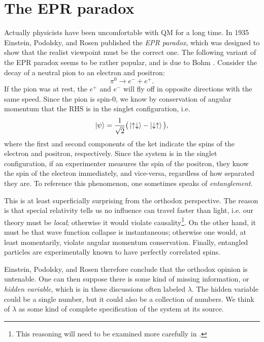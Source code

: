 \section{The EPR paradox}
Actually physicists have been uncomfortable with QM for a long time.
In 1935 Einstein, Podolsky, and Rosen
\cite{einstein_can_1935} published the {\it EPR paradox},
which was designed to show that the realist viewpoint must be
the correct one. The following variant of the EPR paradox seems to be
rather popular, and is due to Bohm \cite{bohm_quantum_1951}.
Consider the decay of a neutral pion to an electron and positron:
\begin{equation}
  \pi^0\to e^-+e^+.
\end{equation}
If the pion was at rest, the $e^+$ and $e^-$ will fly off in opposite
directions with the same speed. Since the pion is spin-0, we know
by conservation of angular momentum that the RHS is in the
singlet configuration, i.e.
\begin{equation}
  \ket{\psi}=\frac{1}{\sqrt{2}}\big(
   \ket{\uparrow\downarrow}-\ket{\downarrow\uparrow}\big),
\end{equation}
where the first and second components of the ket indicate the spins of
the electron and positron, respectively.
Since the system is in the singlet configuration, if an experimenter
measures the spin of the positron, they know the spin of the electron
immediately, and vice-versa, regardless of how separated they are.
To reference this phenomenon, one sometimes speaks of {\it entanglement}.

This is at least superficially surprising from the orthodox perspective.
The reason is that special relativity tells us no influence can travel
faster than light, i.e. our theory must be {\it local}; 
otherwise it would violate causality\footnote{This reasoning will need to
be examined more carefully in .}. 
On the other
hand, it must be that wave function collapse is instantaneous; otherwise
one would, at least momentarily, violate angular momentum conservation.
Finally, entangled particles are experimentally known to have perfectly
correlated spins. 

Einstein, Podolsky, and Rosen therefore conclude
that the orthodox opinion is untenable. One can then suppose there is
some kind of missing information, or {\it hidden variable}, which
is in these discussions often labeled $\lambda$. The hidden variable
could be a single number, but it could also be a collection
of numbers. We think of $\lambda$ as some kind of complete specification of
the system at its source.

